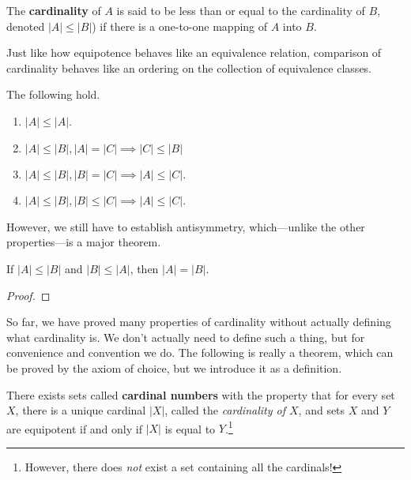   \begin{definition}
    The \textbf{cardinality} of $A$ is said to be less than or equal to the cardinality of $B$, denoted $|A| \leq |B|$) if there is a one-to-one mapping of $A$ into $B$. 
  \end{definition} 

  Just like how equipotence behaves like an equivalence relation, comparison of cardinality behaves like an ordering on the collection of equivalence classes. 

  \begin{theorem}
    The following hold. 
    \begin{enumerate}
      \item $|A| \leq |A|$. 
      \item $|A| \leq |B|, |A| = |C| \implies |C| \leq |B|$ 
      \item $|A| \leq |B|, |B| = |C| \implies |A| \leq |C|$. 
      \item $|A| \leq |B|, |B| \leq |C| \implies |A| \leq |C|$. 
    \end{enumerate}
  \end{theorem}

  However, we still have to establish antisymmetry, which---unlike the other properties---is a major theorem. 

  \begin{theorem}
    If $|A| \leq |B|$ and $|B| \leq |A|$, then $|A| = |B|$. 
  \end{theorem}
  \begin{proof}
    
  \end{proof} 

  So far, we have proved many properties of cardinality without actually defining what cardinality is. We don't actually need to define such a thing, but for convenience and convention we do. The following is really a theorem, which can be proved by the axiom of choice, but we introduce it as a definition. 

  \begin{definition}
    There exists sets called \textbf{cardinal numbers} with the property that for every set $X$, there is a unique cardinal $|X|$, called the \textit{cardinality of $X$}, and sets $X$ and $Y$ are equipotent if and only if $|X|$ is equal to $Y$.\footnote{However, there does \textit{not} exist a set containing all the cardinals!}
  \end{definition} 

